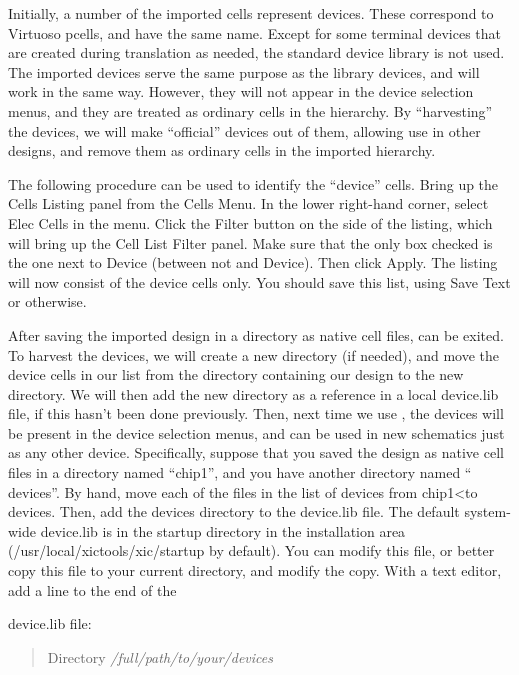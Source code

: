 Initially, a number of the imported cells represent devices.  These
correspond to Virtuoso pcells, and have the same name.  Except for
some terminal devices that are created during translation as needed,
the standard device library is not used.  The imported devices serve
the same purpose as the library devices, and will work in the same
way.  However, they will not appear in the device selection menus, and
they are treated as ordinary cells in the hierarchy.  By
``harvesting'' the devices, we will make ``official'' {\Xic} devices
out of them, allowing use in other designs, and remove them as
ordinary cells in the imported hierarchy.

The following procedure can be used to identify the ``device'' cells. 
Bring up the {\cb Cells Listing} panel from the {\cb Cells Menu}.  In
the lower right-hand corner, select {\cb Elec Cells} in the menu. 
Click the {\cb Filter} button on the side of the listing, which will
bring up the {\cb Cell List Filter} panel.  Make sure that the only
box checked is the one next to {\cb Device} (between {\cb not} and
{\cb Device}).  Then click {\cb Apply}.  The listing will now consist
of the device cells only.  You should save this list, using {\cb Save
Text} or otherwise.

After saving the imported design in a directory as native cell files,
{\Xic} can be exited.  To harvest the devices, we will create a new
directory (if needed), and move the device cells in our list from the
directory containing our design to the new directory.  We will then
add the new directory as a reference in a local {\vt device.lib} file,
if this hasn't been done previously.  Then, next time we use {\Xic},
the devices will be present in the device selection menus, and can be
used in new schematics just as any other device.  Specifically,
suppose that you saved the design as native cell files in a directory
named ``{\vt chip1}'', and you have another directory named ``{\vt
devices}''.  By hand, move each of the files in the list of devices
from {\vt chip1<}to {\vt devices}.  Then, add the {\vt devices}
directory to the {\vt device.lib} file.  The default system-wide {\vt
device.lib} is in the {\vt startup} directory in the installation area
({\vt /usr/local/xictools/xic/startup} by default).  You can modify
this file, or better copy this file to your current directory, and
modify the copy.  With a text editor, add a line to the end of the

{\vt device.lib} file:
\begin{quote}
{\vt Directory}  {\it /full/path/to/your/devices}
\end{quote}

